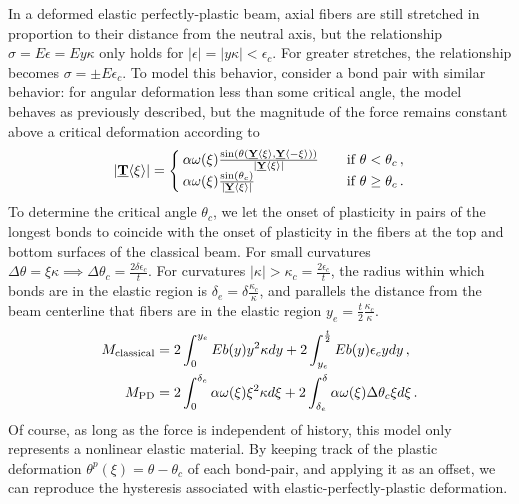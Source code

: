 In a deformed elastic perfectly-plastic beam, axial fibers are still stretched in proportion to their distance from the neutral axis, but the relationship \(\sigma = E\epsilon = Ey\kappa\) only holds for \(|\epsilon| = |y\kappa| < \epsilon_c\). 
For greater stretches, the relationship becomes \(\sigma = \pm E\epsilon_c \). 
To model this behavior, consider a bond pair with similar behavior: for angular deformation less than some critical angle, the model behaves as previously described, but the magnitude of the force remains constant above a critical deformation according to
%
\begin{equation}
|\vstate{T}{}{\xi}| = 
  \begin{cases}
    \alpha \omega(\xi) \frac{\sin(\theta(\vstate{Y}{}{\xi},\vstate{Y}{}{\mathbf{-\xi}}))}{|\vstate{Y}{}{\xi}|} & \quad \text{if } \theta < \theta_c\,,\\
    \alpha \omega(\xi) \frac{\sin(\theta_c)}{|\vstate{Y}{}{\xi}|} & \quad \text{if } \theta \geq \theta_c\,. \\
  \end{cases}
  \label{eq:epp_force}
\end{equation}
%
To determine the critical angle \(\theta_c\), we let the onset of plasticity in pairs of the longest bonds to coincide with the onset of plasticity in the fibers at the top and bottom surfaces of the classical beam. 
For small curvatures \(\Delta\theta = \xi\kappa\implies\Delta\theta_c = \frac{2\delta\epsilon_c}{t}\). 
For curvatures \(|\kappa| > \kappa_c=\frac{2\epsilon_c}{t}\), the radius within which bonds are in the elastic region is \(\delta_e = \delta \frac{\kappa_c}{\kappa}\), and parallels the distance from the beam centerline that fibers are in the elastic region \(y_e = \frac{t}{2} \frac{\kappa_c}{\kappa}\).
%
\begin{align}
  M_\text{classical} &= 2 \int_{0}^{y_e}E b(y)y^2 \kappa dy +2 \int_{y_e}^{\frac{t}{2}}E b(y) \epsilon_c y dy\, ,\notag \\
  M_\text{PD} &= 2 \int_{0}^{\delta_e}\alpha \omega(\xi) \xi^2 \kappa d\xi +2 \int_{\delta_e}^{\delta}\alpha \omega(\xi) \Delta\theta_c \xi d\xi \, .\notag
\end{align}
%
Of course, as long as the force is independent of history, this model only represents a nonlinear elastic material. 
By keeping track of the plastic deformation \(\theta^p (\xi) = \theta-\theta_c\) of each bond-pair, and applying it as an offset, we can reproduce the hysteresis associated with elastic-perfectly-plastic deformation.

